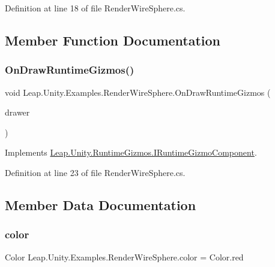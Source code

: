 Definition at line 18 of file Render\+Wire\+Sphere.\+cs.



\subsection{Member Function Documentation}
\mbox{\label{class_leap_1_1_unity_1_1_examples_1_1_render_wire_sphere_afc935457f41e834980d3b143125fc2e6}} 
\subsubsection{\texorpdfstring{OnDrawRuntimeGizmos()}{OnDrawRuntimeGizmos()}}
{\footnotesize\ttfamily void Leap.\+Unity.\+Examples.\+Render\+Wire\+Sphere.\+On\+Draw\+Runtime\+Gizmos (\begin{DoxyParamCaption}\item[{\mbox{\hyperlink{class_leap_1_1_unity_1_1_runtime_gizmos_1_1_runtime_gizmo_drawer}{Runtime\+Gizmo\+Drawer}}}]{drawer }\end{DoxyParamCaption})}



Implements \mbox{\hyperlink{interface_leap_1_1_unity_1_1_runtime_gizmos_1_1_i_runtime_gizmo_component_abaa7cf174480d957b48d0023df50291d}{Leap.\+Unity.\+Runtime\+Gizmos.\+I\+Runtime\+Gizmo\+Component}}.



Definition at line 23 of file Render\+Wire\+Sphere.\+cs.



\subsection{Member Data Documentation}
\mbox{\label{class_leap_1_1_unity_1_1_examples_1_1_render_wire_sphere_a8f446b646d34884cbe051caee8195642}} 
\subsubsection{\texorpdfstring{color}{color}}
{\footnotesize\ttfamily Color Leap.\+Unity.\+Examples.\+Render\+Wire\+Sphere.\+color = Color.\+red}



